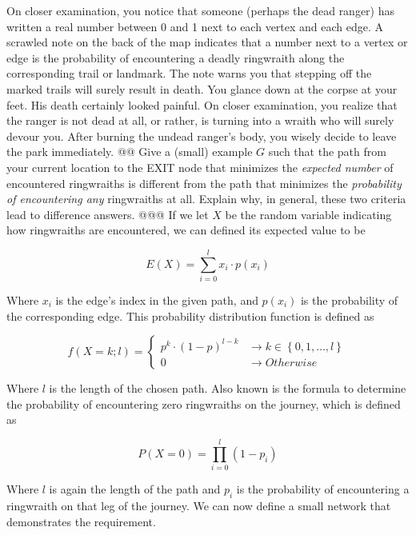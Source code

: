 \documentclass[10pt]{article}\usepackage[]{graphicx}\usepackage[]{xcolor}
\newenvironment{knitrout}{}{} %
\begin{document}
\begin{easylist}[enumerate]
    On closer examination, you notice that someone (perhaps the dead ranger) has written a real number between 0 and 1
    next to each vertex and each edge. A scrawled note on the back of the map indicates that a number next to a vertex
    or edge is the probability of encountering a deadly ringwraith along the corresponding trail or landmark. The note
    warns you that stepping off the marked trails will surely result in death.  You glance down at the corpse at your
    feet. His death certainly looked painful. On closer examination, you realize that the ranger is not dead at all, or
    rather, is turning into a wraith who will surely devour you. After burning the undead ranger's body, you wisely
    decide to leave the park immediately.
    @@ Give a (small) example $G$ such that the path from your current location to the EXIT node that minimizes the
    \textit{expected number} of encountered ringwraiths is different from the path that minimizes the
    \textit{probability of encountering any} ringwraiths at all. Explain why, in general, these two criteria lead to
    difference answers.
    @@@ If we let $X$ be the random variable indicating how ringwraiths are encountered, we can defined its expected
    value to be

    \[
        E(X) = \sum_{i = 0}^l x_i \cdot p(x_i)
    \]

    Where $x_i$ is the edge's index in the given path, and $p(x_i)$ is the probability of the corresponding edge. This
    probability distribution function is defined as

    \[
        f(X = k; l) =
        \begin{cases}
            p^k \cdot (1 - p)^{l - k} &\to k \in \left\{ 0, 1, \ldots, l \right\}\\
            0 &\to Otherwise
        \end{cases}
    \]

    Where $l$ is the length of the chosen path. Also known is the formula to determine the probability of encountering
    zero ringwraiths on the journey, which is defined as

    \[
        P(X=0) = \prod^l_{i=0} (1 - p_i)
    \]

    Where $l$ is again the length of the path and $p_i$ is the probability of encountering a ringwraith on that leg of
    the journey. We can now define a small network that demonstrates the requirement.

\begin{knitrout}
\color{fgcolor}\begin{figure}[H]



\end{figure}
\end{knitrout}
\end{easylist}
\end{document}
